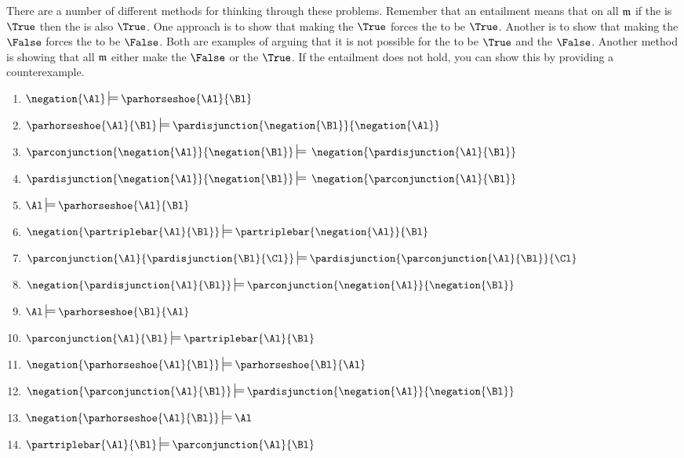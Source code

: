 \begin{commentary}
There are a number of different methods for thinking through these problems.  
Remember that an entailment means that on all $\mathfrak{m}$ if the  is $\True$ then the  is also $\True$.  One approach is to show that making the  $\True$ forces the  to be $\True$.  Another is to show that making the  $\False$ forces the  to be $\False$.  Both are examples of arguing that it is not possible for the  to be $\True$ and the  $\False$.  Another method is showing that all $\mathfrak{m}$ either make the  $\False$ or the  $\True$.  If the entailment does not hold, you can show this by providing a counterexample.
\end{commentary}
\begin{multicols}{2}
\begin{enumerate}
\item {$\negation{\Al}\sdtstile{}{}\parhorseshoe{\Al}{\Bl}$}
\item {$\parhorseshoe{\Al}{\Bl}\sdtstile{}{}\pardisjunction{\negation{\Bl}}{\negation{\Al}}$}
\item {$\parconjunction{\negation{\Al}}{\negation{\Bl}}\sdtstile{}{}\:\negation{\pardisjunction{\Al}{\Bl}}$}
\item\label{HW Entailment 4} {$\pardisjunction{\negation{\Al}}{\negation{\Bl}}\sdtstile{}{}\:\negation{\parconjunction{\Al}{\Bl}}$}
\item {$\Al\sdtstile{}{}\parhorseshoe{\Al}{\Bl}$}
\item {$\negation{\partriplebar{\Al}{\Bl}}\sdtstile{}{}\partriplebar{\negation{\Al}}{\Bl}$} 
\vfill
\item {$\parconjunction{\Al}{\pardisjunction{\Bl}{\Cl}}\sdtstile{}{}\pardisjunction{\parconjunction{\Al}{\Bl}}{\Cl}$}
\item {$\negation{\pardisjunction{\Al}{\Bl}}\sdtstile{}{}\parconjunction{\negation{\Al}}{\negation{\Bl}}$}
\item {$\Al\sdtstile{}{}\parhorseshoe{\Bl}{\Al}$}
\item {$\parconjunction{\Al}{\Bl}\sdtstile{}{}\partriplebar{\Al}{\Bl}$}
\item {$\negation{\parhorseshoe{\Al}{\Bl}}\sdtstile{}{}\parhorseshoe{\Bl}{\Al}$}
\item\label{HW Entailment 12} {$\negation{\parconjunction{\Al}{\Bl}}\sdtstile{}{}\pardisjunction{\negation{\Al}}{\negation{\Bl}}$}
\item {$\negation{\parhorseshoe{\Al}{\Bl}}\sdtstile{}{}\Al$}
\item {$\partriplebar{\Al}{\Bl}\sdtstile{}{}\parconjunction{\Al}{\Bl}$}
\end{enumerate}
\end{multicols}

